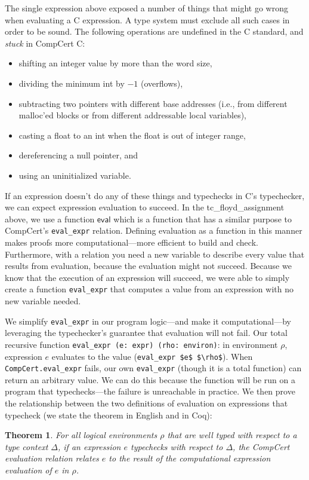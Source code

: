 \documentclass{puthesis}
\begin{document}
The single expression above exposed a number of things that might go wrong when
evaluating a C expression. A type system must exclude all such cases
in order to be sound. The following operations are undefined in the C
standard, and \emph{stuck} in CompCert C:
\begin {itemize}
  \item shifting an integer value by more than the word size,
  \item dividing the minimum int by $-1$  (overflows),
  \item subtracting two pointers with different base addresses (i.e.,
from different malloc'ed blocks or from different addressable local
variables),
  \item casting a float to an int when the float is out of integer range,
  \item dereferencing a null pointer, and
  \item using an uninitialized variable.
\end{itemize}

If an expression doesn't do any of these things and typechecks in C's
typechecker, we can expect expression evaluation to succeed. In the
tc\_floyd\_assignment above, we use a function $\mathsf{eval}$ which
is a function that has a similar purpose to CompCert's
\lstinline|eval_expr| relation.  Defining evaluation as a function in
this manner makes proofs more computational---more efficient to build
and check. Furthermore, with a relation you need a new variable to
describe every value that results from evaluation, because the
evaluation might not succeed. Because we know that the execution of an
expression will succeed, we were able to simply create a function
\lstinline|eval_expr| that computes a value from an expression with no
new variable needed.

We simplify \lstinline|eval_expr| in our program logic---and make it
computational---by leveraging the typechecker's guarantee that
evaluation will not fail.  Our total recursive function
\lstinline|eval_expr (e: expr) (rho: environ)|: in environment $\rho$,
expression $e$ evaluates to the value 
(\lstinline|eval_expr $e$ $\rho$|).  When \lstinline{CompCert.eval_expr} fails, our own
\lstinline{eval_expr} (though it is a total function) can return an
arbitrary value.  We can do this because the function will be run on a
program that typechecks---the failure is unreachable in practice. We
then prove the relationship between the two definitions of evaluation
on expressions that typecheck (we state the theorem in English and in
Coq):
\newtheorem{eval_expr_relate}{Theorem}
\begin{eval_expr_relate}
For all logical environments $\rho$ that are well typed with respect to a type
context $\Delta$, if an expression $e$ typechecks with respect to $\Delta$, the
CompCert evaluation relation relates $e$ to the result of the computational
expression evaluation of $e$ in $\rho$. 
\end{eval_expr_relate}
\end{document}
